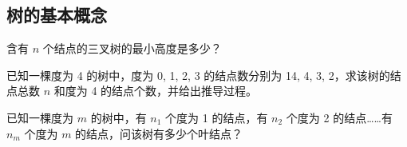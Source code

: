 \subsection{树的基本概念}

\begin{qitems}

    \begin{bbox}
        \qitem 含有 $n$ 个结点的三叉树的最小高度是多少？
    \end{bbox}

    \begin{bbox}
        \qitem 已知一棵度为 4 的树中，度为 0, 1, 2, 3 的结点数分别为 14, 4, 3, 2，求该树的结点总数 $n$ 和度为 4 的结点个数，并给出推导过程。
    \end{bbox}

    \begin{bbox}
        \qitem 已知一棵度为 $m$ 的树中，有 $n_1$ 个度为 1 的结点，有 $n_2$ 个度为 2 的结点……有 $n_m$ 个度为 $m$ 的结点，问该树有多少个叶结点？
    \end{bbox}

\end{qitems} 